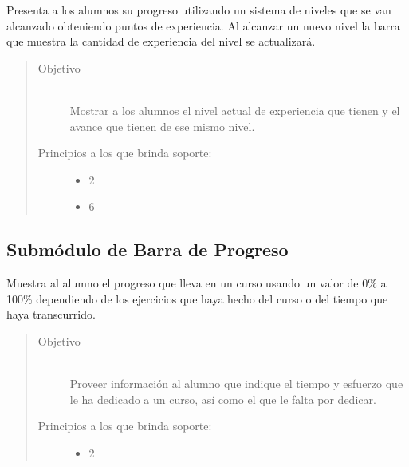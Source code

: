  Presenta a los alumnos su progreso utilizando un sistema de niveles que se van alcanzado
 obteniendo puntos de experiencia. Al alcanzar un nuevo nivel la barra que muestra la
 cantidad de experiencia del nivel se actualizará.

    \begin{quote}
    \begin{description}
    \item[Objetivo] \hfill\\
        Mostrar a los alumnos el nivel actual de experiencia que tienen y el avance que tienen de ese mismo nivel.


    \item[Principios a los que brinda soporte:] \hfill
        \begin{itemize}
            \item 2 \principioII
            \item 6 \principioVI
        \end{itemize}
    \end{description}
    \end{quote}


\subsection{Submódulo de Barra de Progreso}

Muestra al alumno el progreso que lleva en un curso usando un valor de 0\% a 100\% dependiendo de los ejercicios que haya hecho del curso o del tiempo que haya transcurrido.

    \begin{quote}
    \begin{description}
        \item[Objetivo] \hfill\\
            Proveer información al alumno que indique el tiempo y esfuerzo que le ha dedicado a un curso, así como el que le falta por dedicar.

        \item[Principios a los que brinda soporte:] \hfill
        \begin{itemize}
            \item 2 \principioII
        \end{itemize}
    \end{description}
    \end{quote}

